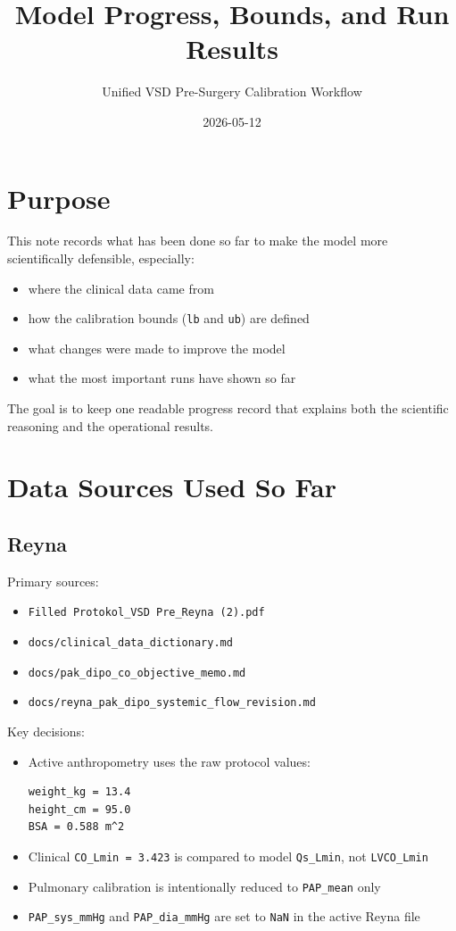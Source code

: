 \documentclass[11pt,a4paper]{article}
\title{Model Progress, Bounds, and Run Results}
\author{Unified VSD Pre-Surgery Calibration Workflow}
\date{2026-05-12}
\begin{document}
\maketitle

\section{Purpose}

This note records what has been done so far to make the model more
scientifically defensible, especially:

\begin{itemize}[leftmargin=1.5em]
    \item where the clinical data came from
    \item how the calibration bounds (\texttt{lb} and \texttt{ub}) are defined
    \item what changes were made to improve the model
    \item what the most important runs have shown so far
\end{itemize}

The goal is to keep one readable progress record that explains both the
scientific reasoning and the operational results.

\section{Data Sources Used So Far}

\subsection{Reyna}

Primary sources:

\begin{itemize}[leftmargin=1.5em]
    \item \texttt{Filled Protokol\_VSD Pre\_Reyna (2).pdf}
    \item \texttt{docs/clinical\_data\_dictionary.md}
    \item \texttt{docs/pak\_dipo\_co\_objective\_memo.md}
    \item \texttt{docs/reyna\_pak\_dipo\_systemic\_flow\_revision.md}
\end{itemize}

Key decisions:

\begin{itemize}[leftmargin=1.5em]
    \item Active anthropometry uses the raw protocol values:
    \begin{verbatim}
weight_kg = 13.4
height_cm = 95.0
BSA = 0.588 m^2
    \end{verbatim}
    \item Clinical \texttt{CO\_Lmin = 3.423} is compared to model
    \texttt{Qs\_Lmin}, not \texttt{LVCO\_Lmin}
    \item Pulmonary calibration is intentionally reduced to \texttt{PAP\_mean} only
    \item \texttt{PAP\_sys\_mmHg} and \texttt{PAP\_dia\_mmHg} are set to
    \texttt{NaN} in the active Reyna file
\end{itemize}
\end{document}
